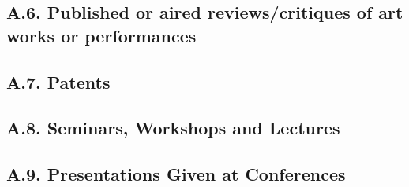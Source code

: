 \documentclass[12pt]{article}
\begin{document}


\subsection*{A.6. Published or aired reviews/critiques of art works or performances}

\subsection*{A.7. Patents}


\subsection*{A.8. Seminars, Workshops and Lectures}


\subsection*{A.9. Presentations Given at Conferences}
\end{document}
